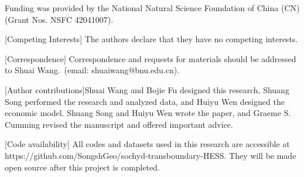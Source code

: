 
Funding was provided by the National Natural Science Foundation of China (CN) (Grant Nos. NSFC 42041007).

[Competing Interests] The authors declare that they have no competing interests.

[Correspondence] Correspondence and requests for materials should be addressed to Shuai Wang.~(email: shuaiwang@bnu.edu.cn).

[Author contributions]Shuai Wang and Bojie Fu designed this research, Shuang Song performed the research and analyzed data, and Huiyu Wen designed the economic model. Shuang Song and Huiyu Wen wrote the paper, and Graeme S. Cumming revised the manuscript and offered important advice.

[Code availability] All codes and datasets used in this research are accessible at https://github.com/SongshGeo/sochyd-transboundary-HESS. They will be made open source after this project is completed.